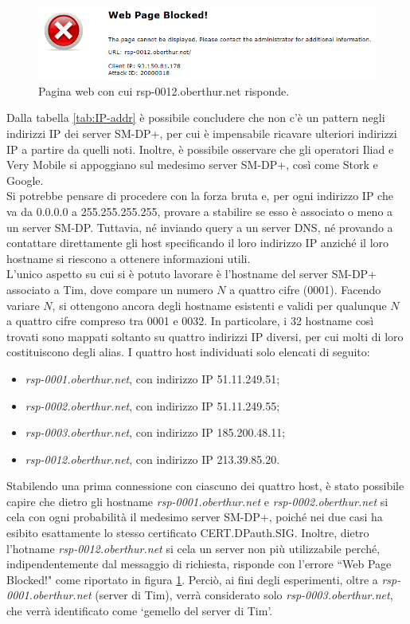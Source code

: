 \documentclass[10pt, oneside]{book}
\begin{document}
\begin{figure}
\includegraphics[width=\linewidth]{web-page-blocked.png}
\caption{Pagina web con cui rsp-0012.oberthur.net risponde.}
\label{fig:web-page-blocked}
\end{figure}
\noindent Dalla tabella \ref{tab:IP-addr} è possibile concludere che non c'è un pattern negli indirizzi IP dei server SM-DP+, per cui è impensabile ricavare ulteriori indirizzi IP a partire da quelli noti. Inoltre, è possibile osservare che gli operatori Iliad e Very Mobile si appoggiano sul medesimo server SM-DP+, così come Stork e Google.\\
Si potrebbe pensare di procedere con la forza bruta e, per ogni indirizzo IP che va da 0.0.0.0 a 255.255.255.255, provare a stabilire se esso è associato o meno a un server SM-DP. Tuttavia, né inviando query a un server DNS, né provando a contattare direttamente gli host specificando il loro indirizzo IP anziché il loro hostname si riescono a ottenere informazioni utili.\\
L'unico aspetto su cui si è potuto lavorare è l'hostname del server SM-DP+ associato a Tim, dove compare un numero $N$ a quattro cifre (0001). Facendo variare $N$, si ottengono ancora degli hostname esistenti e validi per qualunque $N$ a quattro cifre compreso tra 0001 e 0032. In particolare, i 32 hostname così trovati sono mappati soltanto su quattro indirizzi IP diversi, per cui molti di loro costituiscono degli alias. I quattro host individuati solo elencati di seguito:
\begin{itemize}
\item \textit{rsp-0001.oberthur.net}, con indirizzo IP 51.11.249.51;
\item \textit{rsp-0002.oberthur.net}, con indirizzo IP 51.11.249.55;
\item \textit{rsp-0003.oberthur.net}, con indirizzo IP 185.200.48.11;
\item \textit{rsp-0012.oberthur.net}, con indirizzo IP 213.39.85.20.
\end{itemize}
Stabilendo una prima connessione con ciascuno dei quattro host, è stato possibile capire che dietro gli hostname \textit{rsp-0001.oberthur.net} e \textit{rsp-0002.oberthur.net} si cela con ogni probabilità il medesimo server SM-DP+, poiché nei due casi ha esibito esattamente lo stesso certificato CERT.DPauth.SIG. Inoltre, dietro l'hotname \textit{rsp-0012.oberthur.net} si cela un server non più utilizzabile perché, indipendentemente dal messaggio di richiesta, risponde con l'errore ``Web Page Blocked!" come riportato in figura \ref{fig:web-page-blocked}. Perciò, ai fini degli esperimenti, oltre a \textit{rsp-0001.oberthur.net} (server di Tim), verrà considerato solo \textit{rsp-0003.oberthur.net}, che verrà identificato come `gemello del server di Tim'.\\
\end{document}

